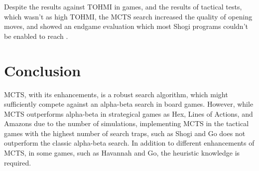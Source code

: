 \documentclass[paper=8.27in:11.69in]{scrartcl}
\begin{document}
Despite the results against TOHMI in games, and the results of tactical tests, which wasn’t as high TOHMI, the MCTS search increased the quality of opening moves, and showed an endgame evaluation which most Shogi programs couldn’t be enabled to reach \cite{Sato2010ASP}.\\
\section{Conclusion}
MCTS, with its enhancements, is a robust search algorithm, which might sufficiently compete against an alpha-beta search in board games. However, while MCTS outperforms alpha-beta in strategical games as Hex, Lines of Actions, and Amazons due to the number of simulations, implementing MCTS in the tactical games with the highest number of search traps, such as Shogi and Go does not outperform the classic alpha-beta search. In addition to different enhancements of MCTS, in some games, such as Havannah and Go, the heuristic knowledge is required.



\end{document}
